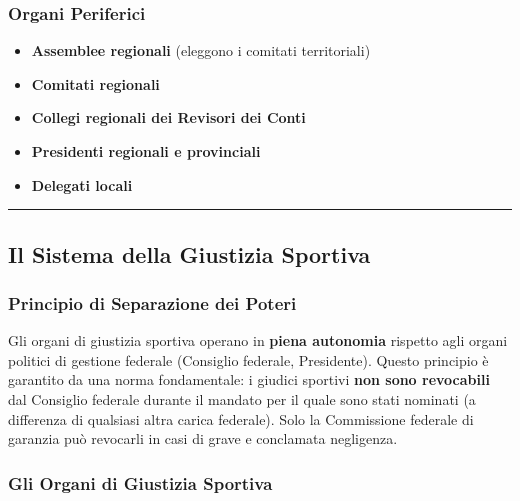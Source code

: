 \documentclass[a4paper,11pt]{article}
\providecommand{\tightlist}{%
  \setlength{\itemsep}{0pt}\setlength{\parskip}{0pt}}
\begin{document}
\subsubsection{Organi Periferici}\label{organi-periferici}

\begin{itemize}
      \tightlist
      \item
            \textbf{Assemblee regionali} (eleggono i comitati territoriali)
      \item
            \textbf{Comitati regionali}
      \item
            \textbf{Collegi regionali dei Revisori dei Conti}
      \item
            \textbf{Presidenti regionali e provinciali}
      \item
            \textbf{Delegati locali}
\end{itemize}

\begin{center}\rule{0.5\linewidth}{0.5pt}\end{center}

\subsection{Il Sistema della Giustizia
      Sportiva}\label{il-sistema-della-giustizia-sportiva}

\subsubsection{Principio di Separazione dei
      Poteri}\label{principio-di-separazione-dei-poteri}

Gli organi di giustizia sportiva operano in \textbf{piena autonomia}
rispetto agli organi politici di gestione federale (Consiglio federale,
Presidente). Questo principio è garantito da una norma fondamentale: i
giudici sportivi \textbf{non sono revocabili} dal Consiglio federale
durante il mandato per il quale sono stati nominati (a differenza di
qualsiasi altra carica federale). Solo la Commissione federale di
garanzia può revocarli in casi di grave e conclamata negligenza.

\subsubsection{Gli Organi di Giustizia
      Sportiva}\label{gli-organi-di-giustizia-sportiva}
\end{document}
